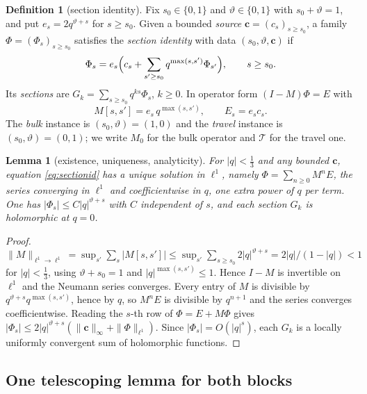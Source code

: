 \documentclass[11pt]{article}
\theoremstyle{plain}
\newtheorem{lemma}[theorem]{Lemma}
\theoremstyle{definition}
\newtheorem{definition}[theorem]{Definition}
\theoremstyle{remark}
\begin{document}
\begin{definition}[section identity]\label{def:model}
Fix $s_0\in\{0,1\}$ and $\vartheta\in\{0,1\}$ with $s_0+\vartheta=1$, and put
$e_s=2q^{\vartheta+s}$ for $s\ge s_0$. Given a bounded \emph{source} $\mathbf c=(c_s)_{s\ge s_0}$,
a family $\Phi=(\Phi_s)_{s\ge s_0}$ satisfies the \emph{section identity} with data
$(s_0,\vartheta,\mathbf c)$ if
\begin{equation}\label{eq:sectionid}
   \Phi_s=e_s\Bigl(c_s+\sum_{s'\ge s_0}q^{\max(s,s')}\Phi_{s'}\Bigr),\qquad s\ge s_0 .
\end{equation}
Its \emph{sections} are $G_k=\sum_{s\ge s_0}q^{ks}\Phi_s$, $k\ge0$. In operator form
$(I-M)\Phi=E$ with
\begin{equation}\label{eq:transfer}
   M[s,s']=e_s\,q^{\max(s,s')},\qquad E_s=e_sc_s .
\end{equation}
The \emph{bulk} instance is $(s_0,\vartheta)=(1,0)$ and the \emph{travel} instance is
$(s_0,\vartheta)=(0,1)$; we write $M_0$ for the bulk operator and $\mathcal T$ for the travel one.
\end{definition}

\begin{lemma}[existence, uniqueness, analyticity]\label{lem:modelexist}
For $|q|<\tfrac13$ and any bounded $\mathbf c$, equation \eqref{eq:sectionid} has a unique solution
in $\ell^1$, namely $\Phi=\sum_{n\ge0}M^nE$, the series converging in $\ell^1$ and coefficientwise
in $q$, one extra power of $q$ per term. One has $|\Phi_s|\le C|q|^{\vartheta+s}$ with $C$
independent of $s$, and each section $G_k$ is holomorphic at $q=0$.
\end{lemma}

\begin{proof}
$\|M\|_{\ell^1\to\ell^1}=\sup_{s'}\sum_s|M[s,s']|\le\sup_{s'}\sum_{s\ge s_0}2|q|^{\vartheta+s}
=2|q|/(1-|q|)<1$ for $|q|<\tfrac13$, using $\vartheta+s_0=1$ and $|q|^{\max(s,s')}\le1$. Hence
$I-M$ is invertible on $\ell^1$ and the Neumann series converges. Every entry of $M$ is divisible
by $q^{\vartheta+s}q^{\max(s,s')}$, hence by $q$, so $M^nE$ is divisible by $q^{n+1}$ and the
series converges coefficientwise. Reading the $s$-th row of $\Phi=E+M\Phi$ gives
$|\Phi_s|\le2|q|^{\vartheta+s}(\|\mathbf c\|_\infty+\|\Phi\|_{\ell^1})$. Since
$|\Phi_s|=O(|q|^{s})$, each $G_k$ is a locally uniformly convergent sum of holomorphic functions.
\end{proof}

\subsection{One telescoping lemma for both blocks}\label{sec:tel}
\end{document}
